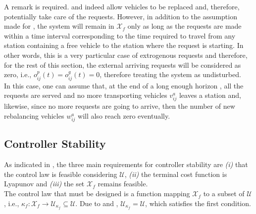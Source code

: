 A remark is required.  and  indeed allow vehicles to be replaced and, therefore, potentially take care of the requests. However, in addition to the assumption made for , the system will remain in $\mathcal{X}_f$ only as long as the requests are made within a time interval corresponding to the time required to travel from any station containing a free vehicle to the station where the request is starting. In other words, this is a very particular case of extrogenous requests and therefore, for the rest of this section, the external arriving requests will be considered as zero, i.e., $o^p_{ij}(t) = o^g_{ij}(t) = 0$, therefore treating the system as undisturbed. \\
In this case, one can assume that, at the end of a long enough horizon , all the requests are served and no more transporting vehicles $v^a_{ij}$ leaves a station and, likewise, since no more requests are going to arrive, then the number of new rebalancing vehicles $w^a_{ij}$ will also reach zero eventually. 
\subsection{Controller Stability}
As indicated in , the three main requirements for controller stability are \textit{(i)} that the control law is feasible considering $\mathcal{U}$, \textit{(ii)} the terminal cost function is Lyapunov and \textit{(iii)} the set $\mathcal{X}_f$ remains feasible.\\
 The control law that must be designed is a function mapping $\mathcal{X}_f$ to a subset of $\mathcal{U}$, i.e., $\kappa_f:\mathcal{X}_f \rightarrow\mathcal{U}_{\kappa_f} \subseteq \mathcal{U}$. Due to  and , $\mathcal{U}_{\kappa_f} = \mathcal{U}$, which satisfies the first condition. %


